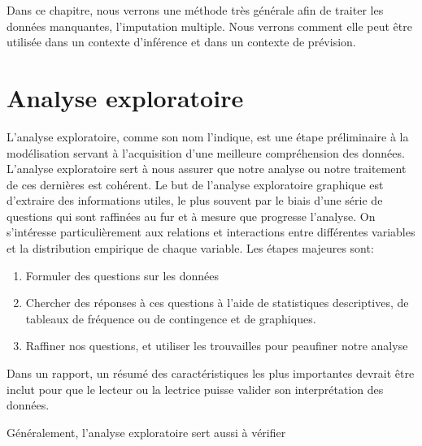 \documentclass[
  11pt,
  letterpaper,
]{scrbook}
\providecommand{\tightlist}{%
  \setlength{\itemsep}{0pt}\setlength{\parskip}{0pt}}\usepackage{longtable,booktabs,array}
\theoremstyle{definition}
\theoremstyle{remark}
\begin{document}
Dans ce chapitre, nous verrons une méthode très générale afin de traiter
les données manquantes, l'imputation multiple. Nous verrons comment elle
peut être utilisée dans un contexte d'inférence et dans un contexte de
prévision.


\chapter{Analyse exploratoire}\label{analyse-exploratoire}

L'analyse exploratoire, comme son nom l'indique, est une étape
préliminaire à la modélisation servant à l'acquisition d'une meilleure
compréhension des données. L'analyse exploratoire sert à nous assurer
que notre analyse ou notre traitement de ces dernières est cohérent. Le
but de l'analyse exploratoire graphique est d'extraire des informations
utiles, le plus souvent par le biais d'une série de questions qui sont
raffinées au fur et à mesure que progresse l'analyse. On s'intéresse
particulièrement aux relations et interactions entre différentes
variables et la distribution empirique de chaque variable. Les étapes
majeures sont:

\begin{enumerate}
\def\labelenumi{\arabic{enumi}.}
\tightlist
\item
  Formuler des questions sur les données
\item
  Chercher des réponses à ces questions à l'aide de statistiques
  descriptives, de tableaux de fréquence ou de contingence et de
  graphiques.
\item
  Raffiner nos questions, et utiliser les trouvailles pour peaufiner
  notre analyse
\end{enumerate}

Dans un rapport, un résumé des caractéristiques les plus importantes
devrait être inclut pour que le lecteur ou la lectrice puisse valider
son interprétation des données.

Généralement, l'analyse exploratoire sert aussi à vérifier
\end{document}
